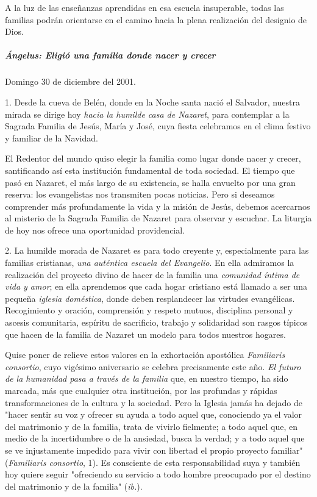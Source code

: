 \documentclass[]{article}
\let\oldsubparagraph\subparagraph
\renewcommand{\subparagraph}[1]{\oldsubparagraph{#1}\mbox{}}
\begin{document}
A la luz de las enseñanzas aprendidas en esa escuela insuperable, todas
las familias podrán orientarse en el camino hacia la plena realización
del designio de Dios.

\subparagraph{Ángelus: Eligió una familia donde nacer y
crecer}\label{uxe1ngelus-eligiuxf3-una-familia-donde-nacer-y-crecer}

Domingo 30 de diciembre del 2001.

1. Desde la cueva de Belén, donde en la Noche santa nació el Salvador,
nuestra mirada se dirige hoy \emph{hacia la humilde casa de Nazaret},
para contemplar a la Sagrada Familia de Jesús, María y José, cuya fiesta
celebramos en el clima festivo y familiar de la Navidad.

El Redentor del mundo quiso elegir la familia como lugar donde nacer y
crecer, santificando así esta institución fundamental de toda sociedad.
El tiempo que pasó en Nazaret, el más largo de su existencia, se halla
envuelto por una gran reserva: los evangelistas nos transmiten pocas
noticias. Pero si deseamos comprender más profundamente la vida y la
misión de Jesús, debemos acercarnos al misterio de la Sagrada Familia de
Nazaret para observar y escuchar. La liturgia de hoy nos ofrece una
oportunidad providencial.

2. La humilde morada de Nazaret es para todo creyente y, especialmente
para las familias cristianas, \emph{una auténtica escuela del
Evangelio}. En ella admiramos la realización del proyecto divino de
hacer de la familia una \emph{comunidad íntima de vida y amor}; en ella
aprendemos que cada hogar cristiano está llamado a ser una pequeña
\emph{iglesia doméstica}, donde deben resplandecer las virtudes
evangélicas. Recogimiento y oración, comprensión y respeto mutuos,
disciplina personal y ascesis comunitaria, espíritu de sacrificio,
trabajo y solidaridad son rasgos típicos que hacen de la familia de
Nazaret un modelo para todos nuestros hogares.

Quise poner de relieve estos valores en la exhortación apostólica
\emph{Familiaris consortio}, cuyo vigésimo aniversario se celebra
precisamente este año. \emph{El futuro de la humanidad pasa a través de
la familia} que, en nuestro tiempo, ha sido marcada, más que cualquier
otra institución, por las profundas y rápidas transformaciones de la
cultura y la sociedad. Pero la Iglesia jamás ha dejado de "hacer sentir
su voz y ofrecer su ayuda a todo aquel que, conociendo ya el valor del
matrimonio y de la familia, trata de vivirlo fielmente; a todo aquel
que, en medio de la incertidumbre o de la ansiedad, busca la verdad; y a
todo aquel que se ve injustamente impedido para vivir con libertad el
propio proyecto familiar" (\emph{Familiaris consortio}, 1). Es
consciente de esta responsabilidad suya y también hoy quiere seguir
"ofreciendo su servicio a todo hombre preocupado por el destino del
matrimonio y de la familia" (\emph{ib.}).
\end{document}

